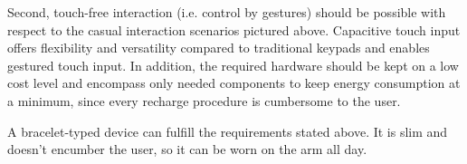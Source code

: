 Second, touch-free interaction (i.e. control by gestures) should be possible with respect to the casual interaction scenarios pictured above. Capacitive touch input offers flexibility and versatility compared to traditional keypads and enables gestured touch input. In addition, the required hardware should be kept on a low cost level and encompass only needed components to keep energy consumption at a minimum, since every recharge procedure is cumbersome to the user.

A bracelet-typed device can fulfill the requirements stated above. It is slim and doesn't encumber the user, so it can be worn on the arm all day.